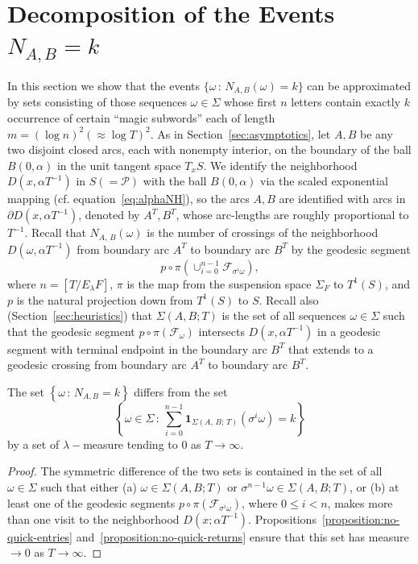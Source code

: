 \documentclass[AHL, Unicode, longabstracts, published]{cedram}
\newcommand{\xset}[1]{\left\{ #1 \right\}}
\begin{document}
\section{Decomposition of the Events\texorpdfstring{$N_{A,B}=k$}{NA,B=k}}\label{sec:decomposition}

In this section we show that the events $\{\omega \,:\, N_{A,B} (\omega) =k\}$ can be approximated by sets consisting of those sequences $\omega \in \Sigma$ whose first $n$ letters contain exactly $k$ occurrence of certain ``magic subwords'' each of length $m= (\log n)^{2} (\approx \log T)^{2}$. As in Section~\ref{sec:asymptotics}, let $A,B$ be any two disjoint closed arcs, each with nonempty interior, on the boundary of the ball $B (0,\alpha)$ in the unit tangent space $T_x S$. We identify the neighborhood $D(x,\alpha T^{-1})$ in $S (=\mathcal{P})$ with the ball $B(0,\alpha)$ via the scaled exponential mapping (cf. equation~\eqref{eq:alphaNH}), so the arcs $A,B$ are identified with arcs in $\partial D(x,\alpha T^{-1})$, denoted by $A^{T},B^{T}$, whose arc-lengths are roughly proportional to $T^{-1}$. Recall that $N_{A,\,B} (\omega)$ is the number of crossings of the neighborhood $D(\omega,\alpha T^{-1}) $ from boundary arc $A^{T}$ to boundary arc $B^{T}$ by the geodesic segment
\[
p\circ\pi \left (\cup_{i=0}^{n-1}\mathcal{F}_{\sigma^{i}\omega}\right),
\]
where $n=[T/E_{\lambda}F]$, $\pi$ is the map from the suspension space $\Sigma_F$ to $T^1(S)$, and $p$ is the natural projection down from $T^1(S)$ to $S$. Recall also (Section~\ref{sec:heuristics}) that $\Sigma (A,B;T)$ is the set of all sequences $\omega \in \Sigma$ such that the geodesic segment $p\circ\pi(\mathcal{F}_{\omega})$ intersects $D(x, \alpha T^{-1})$ in a geodesic segment with terminal endpoint in the boundary arc $B^{T}$ that extends to a geodesic crossing from boundary arc $A^{T}$ to boundary arc $B^{T}$.

\begin{lemm}\label{lemma:n=k}
The set $\xset {\omega\,:\, N_{A,B}=k}$ differs from the set
\[
\xset {\omega \in \Sigma \,:\,
\sum_{i=0}^{n-1}\mathbf{1}_{\Sigma(A,\,B;\,T)}(\sigma^{i}\omega)=k }
\]
by a set of $\lambda-$measure tending to $0$ as $T \rightarrow \infty$.
\end{lemm}

\begin{proof}
The symmetric difference of the two sets is contained in the set of all $\omega\in\Sigma$ such that either (a) $\omega \in
\Sigma(A,B;T)$ or $\sigma^{n-1}\omega \in \Sigma(A,B;T)$, or (b) at least one of the geodesic segments $p\circ \pi (\mathcal{F}_{\sigma^{i}\omega})$, where $0 \leq i < n$, makes more than one visit to the neighborhood $D(x; \alpha T^{-1})$. Propositions~\ref{proposition:no-quick-entries} and~\ref{proposition:no-quick-returns} ensure that this set has measure $\rightarrow 0$ as $T \rightarrow \infty$.
\end{proof}
\end{document}
